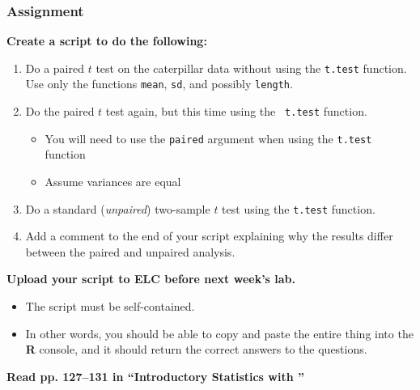\documentclass[color=usenames,dvipsnames]{beamer}\usepackage[]{graphicx}\usepackage[]{color}
\begin{document}







\begin{frame}
  \frametitle{Assignment}
  \footnotesize
  {\bf Create a script to do the following:}
  \begin{enumerate}[\bf (1)]
    \item Do a paired $t$ test on the caterpillar data without using the {\tt t.test}
      function. Use only the functions {\tt mean}, {\tt sd}, and
      possibly {\tt length}.
    \item Do the paired $t$ test again, but this time using the {\tt
        t.test} function.
      \begin{itemize}
        \item You will need to use the {\tt paired} argument when using the {\tt t.test} function
        \item Assume variances are equal
      \end{itemize}
    \item Do a standard ({\it unpaired}) two-sample $t$ test using
      the {\tt t.test} function.
    \item Add a comment to the end of your script explaining why the
      results differ between the paired and unpaired analysis.
  \end{enumerate}
  \vfill
  {\bf Upload your script to ELC before next week's lab.}
  \begin{itemize}
    \item The script must be self-contained.
    \item In other words, you should be able to copy and paste the
      entire thing into the {\bf R} console, and it should return the
      correct answers to the questions.
  \end{itemize}
  \vfill
   {\bf Read pp. 127--131 in ``Introductory Statistics with \R''}
\end{frame}
\end{document}
